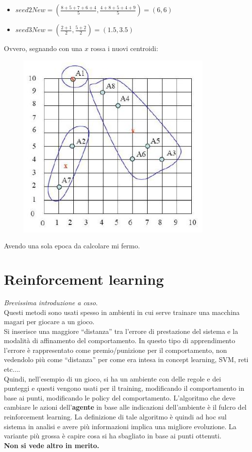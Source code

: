 \begin{esempio}
\begin{itemize}
    \item $seed2New=\left(\frac{8+5+7+6+4}{5},\frac{4+8+5+4+9}{5}\right)=(6, 6)$
    \item $seed3New=\left(\frac{2+1}{2},\frac{5+2}{2}\right)=(1.5, 3.5)$
  \end{itemize}
  Ovvero, segnando con una $x$ rossa i nuovi centroidi:
  \begin{figure}[H]
    \centering
    \includegraphics[scale = 0.4]{img/clue3.jpg}
  \end{figure}
  Avendo una sola epoca da calcolare mi fermo.
\end{esempio}
\chapter{Reinforcement learning}
\textit{Brevissima introduzione a caso}.\\
Questi metodi sono usati spesso in ambienti in cui serve trainare una macchina
magari per giocare a un gioco.\\
Si inserisce una maggiore ``distanza'' tra l'errore di prestazione del sistema e
la modalità di affinamento del comportamento. In questo tipo di apprendimento
l'errore è rappresentato come premio/punizione per il comportamento, non
vedendolo più come ``distanza'' per come era intesa in concept learning, SVM,
reti etc$\ldots$.\\
Quindi, nell'esempio di un gioco, si ha un ambiente con delle regole e dei
punteggi e questi vengono usati per il training, modificando il comportamento in
base ai punti, modificando le policy del comportamento. L'algoritmo che deve
cambiare le azioni dell'\textbf{agente} in base alle indicazioni dell'ambiente è
il fulcro del reinforcement learning. La definizione di tale algoritmo è quindi
ad hoc sul sistema in analisi e avere più informazioni implica una migliore
evoluzione. La variante più grossa è capire cosa si ha sbagliato in base ai
punti ottenuti.  \\
\textbf{Non si vede altro in merito.}
